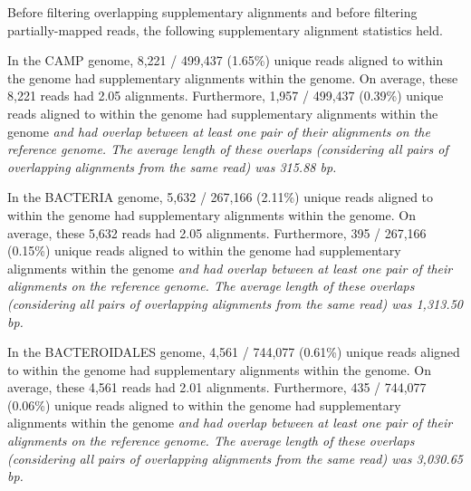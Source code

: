 Before filtering overlapping supplementary alignments and before filtering
partially-mapped reads, the following supplementary alignment statistics held.

In the CAMP genome, 8,221 / 499,437 (1.65\%) unique reads aligned to within the genome had supplementary alignments within the genome.
On average, these 8,221 reads had 2.05 alignments.
Furthermore, 1,957 / 499,437 (0.39\%) unique reads aligned to within the genome had supplementary alignments within the genome \em{and} had overlap between at least one pair of their alignments on the reference genome.
The average length of these overlaps (considering all pairs of overlapping alignments from the same read) was 315.88 bp.

In the BACTERIA genome, 5,632 / 267,166 (2.11\%) unique reads aligned to within the genome had supplementary alignments within the genome.
On average, these 5,632 reads had 2.05 alignments.
Furthermore, 395 / 267,166 (0.15\%) unique reads aligned to within the genome had supplementary alignments within the genome \em{and} had overlap between at least one pair of their alignments on the reference genome.
The average length of these overlaps (considering all pairs of overlapping alignments from the same read) was 1,313.50 bp.

In the BACTEROIDALES genome, 4,561 / 744,077 (0.61\%) unique reads aligned to within the genome had supplementary alignments within the genome.
On average, these 4,561 reads had 2.01 alignments.
Furthermore, 435 / 744,077 (0.06\%) unique reads aligned to within the genome had supplementary alignments within the genome \em{and} had overlap between at least one pair of their alignments on the reference genome.
The average length of these overlaps (considering all pairs of overlapping alignments from the same read) was 3,030.65 bp.
\endinput